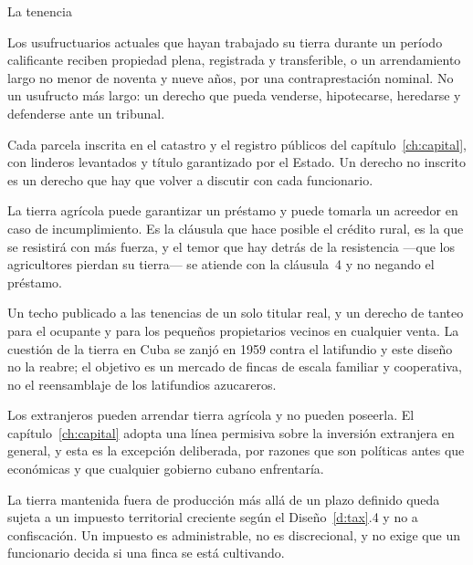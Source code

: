 \begin{design}{La tenencia}
\label{d:tenure}
\begin{rules}
 Los usufructuarios actuales que hayan trabajado su
tierra durante un período calificante reciben propiedad plena, registrada y transferible, o un
arrendamiento largo no menor de noventa y nueve años, por una contraprestación nominal. No un
usufructo más largo: un derecho que pueda venderse, hipotecarse, heredarse y defenderse ante
un tribunal.

 Cada parcela inscrita en el catastro y el registro públicos del
capítulo~\ref{ch:capital}, con linderos levantados y título garantizado por el Estado. Un
derecho no inscrito es un derecho que hay que volver a discutir con cada funcionario.

 La tierra agrícola puede garantizar un préstamo y puede tomarla un
acreedor en caso de incumplimiento. Es la cláusula que hace posible el crédito rural, es la
que se resistirá con más fuerza, y el temor que hay detrás de la resistencia ---que los
agricultores pierdan su tierra--- se atiende con la cláusula~4 y no negando el préstamo.

 Un techo publicado a las tenencias de un solo titular real, y
un derecho de tanteo para el ocupante y para los pequeños propietarios vecinos en cualquier
venta. La cuestión de la tierra en Cuba se zanjó en 1959 contra el latifundio y este diseño no
la reabre; el objetivo es un mercado de fincas de escala familiar y cooperativa, no el
reensamblaje de los latifundios azucareros.

 Los extranjeros pueden arrendar tierra agrícola y no pueden
poseerla. El capítulo~\ref{ch:capital} adopta una línea permisiva sobre la inversión
extranjera en general, y esta es la excepción deliberada, por razones que son políticas antes
que económicas y que cualquier gobierno cubano enfrentaría.

 La tierra mantenida fuera de producción más allá de un plazo definido queda
sujeta a un impuesto territorial creciente según el Diseño~\ref{d:tax}.4 y no a confiscación.
Un impuesto es administrable, no es discrecional, y no exige que un funcionario decida si una
finca se está cultivando.
\end{rules}
\end{design}

